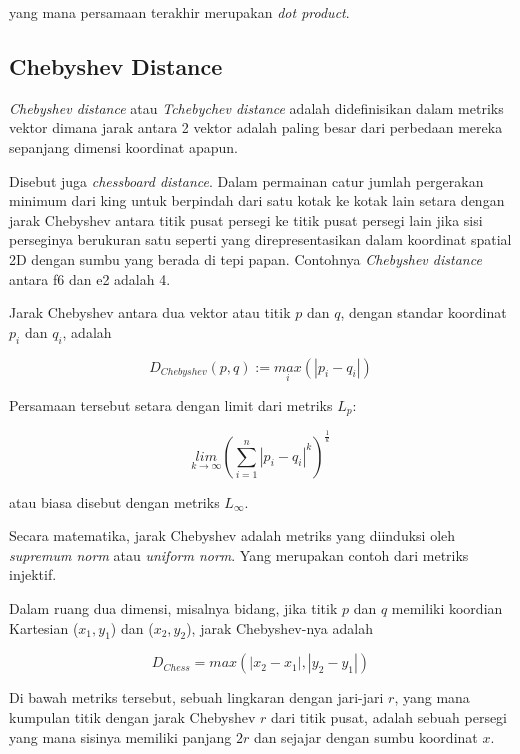 yang mana persamaan terakhir merupakan \textit{dot product}. \cite{euclidean.wiki}

\subsection{Chebyshev Distance}
\textit{Chebyshev distance} atau \textit{Tchebychev distance} adalah didefinisikan dalam metriks vektor dimana jarak antara 2 vektor adalah paling besar dari perbedaan mereka sepanjang dimensi koordinat apapun. 

	Disebut juga \textit{chessboard distance}. Dalam permainan catur jumlah pergerakan minimum dari king untuk berpindah dari satu kotak ke kotak lain setara dengan jarak Chebyshev antara titik pusat persegi ke titik pusat persegi lain jika sisi perseginya berukuran satu seperti yang direpresentasikan dalam koordinat spatial 2D dengan sumbu yang berada di tepi papan. Contohnya \textit{Chebyshev distance} antara f6 dan e2 adalah 4.
	
	Jarak Chebyshev antara dua vektor atau titik $p$ dan $q$, dengan standar koordinat $p_i$ dan $q_i$, adalah
	
\begin{equation}
	D_{Chebyshev}\left ( p,q \right ) := \underset{i}{max}\left ( \left | p_{i} - q_{i} \right | \right )
\end{equation}	 

Persamaan tersebut setara dengan limit dari metriks $L_p$:

\begin{equation}
\underset{k\rightarrow \infty }{lim} {\left ( \sum_{i = 1}^{n} {\left | p_i - q_i \right |}^{k}\right )}^{\frac{1}{k}}
\end{equation}

atau biasa disebut dengan metriks $L_\infty$.

	Secara matematika, jarak Chebyshev adalah metriks yang diinduksi oleh \textit{supremum norm} atau \textit{uniform norm}. Yang merupakan contoh dari metriks injektif.
	
	Dalam ruang dua dimensi, misalnya bidang, jika titik $p$ dan $q$ memiliki koordian Kartesian ($x_1, y_1$) dan ($x_2, y_2$), jarak Chebyshev-nya adalah
	
	\begin{equation}
	D_{Chess} = max \left ( \left | x_2 - x_1 \right |, \left | y_2 - y_1 \right | \right )
	\end{equation}
	
	Di bawah metriks tersebut, sebuah lingkaran dengan jari-jari $r$, yang mana kumpulan titik dengan jarak Chebyshev $r$ dari titik pusat, adalah sebuah persegi yang mana sisinya memiliki panjang $2r$ dan sejajar dengan sumbu koordinat $x$. \cite{chebyshev.wiki}

